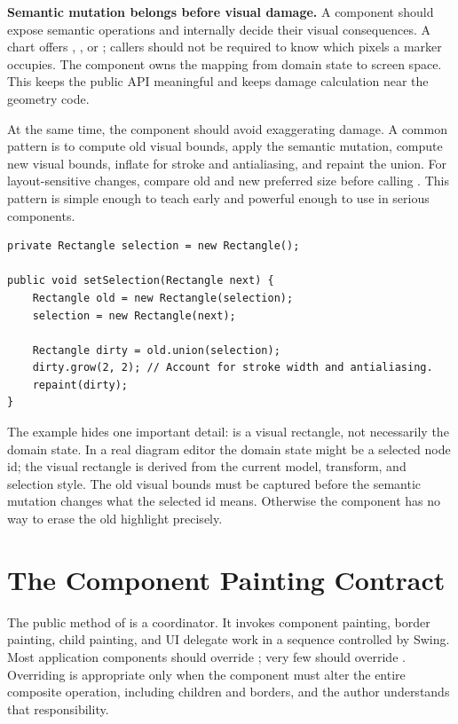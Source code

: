 \textbf{Semantic mutation belongs before visual damage.} A component should expose semantic operations and internally decide their visual consequences. A chart offers , , or ; callers should not be required to know which pixels a marker occupies. The component owns the mapping from domain state to screen space. This keeps the public API meaningful and keeps damage calculation near the geometry code.

At the same time, the component should avoid exaggerating damage. A common pattern is to compute old visual bounds, apply the semantic mutation, compute new visual bounds, inflate for stroke and antialiasing, and repaint the union. For layout-sensitive changes, compare old and new preferred size before calling . This pattern is simple enough to teach early and powerful enough to use in serious components.

\begin{lstlisting}[caption={Repainting the union of old and new selection bounds.}]
private Rectangle selection = new Rectangle();

public void setSelection(Rectangle next) {
    Rectangle old = new Rectangle(selection);
    selection = new Rectangle(next);

    Rectangle dirty = old.union(selection);
    dirty.grow(2, 2); // Account for stroke width and antialiasing.
    repaint(dirty);
}
\end{lstlisting}

The example hides one important detail:  is a visual rectangle, not necessarily the domain state. In a real diagram editor the domain state might be a selected node id; the visual rectangle is derived from the current model, transform, and selection style. The old visual bounds must be captured before the semantic mutation changes what the selected id means. Otherwise the component has no way to erase the old highlight precisely.

\section{The Component Painting Contract}

The public  method of  is a coordinator. It invokes component painting, border painting, child painting, and UI delegate work in a sequence controlled by Swing. Most application components should override ; very few should override . Overriding  is appropriate only when the component must alter the entire composite operation, including children and borders, and the author understands that responsibility.

